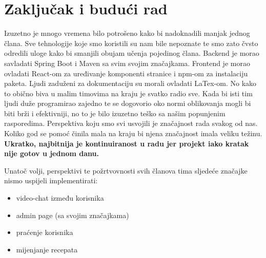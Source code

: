 \chapter{Zaključak i budući rad}
		
		
		\noindent Izuzetno je mnogo vremena bilo potrošeno kako bi nadoknadili manjak jednog člana. Sve tehnologije koje smo koristili su nam bile nepoznate te smo zato čvsto odredili uloge kako bi smanjili obujam učenja pojedinog člana.
		 \noindent Backend je morao savladati Spring Boot i Maven sa svim svojim značajkama. Frontend je morao ovladati React-om za uređivanje komponenti stranice i npm-om za instalaciju paketa. Ljudi zaduženi za dokumentaciju su morali ovladati LaTex-om.
		 \noindent No kako to obično biva u malim timovima na kraju je svatko radio sve. Kada bi isti tim ljudi duže programirao zajedno te se dogovorio oko normi oblikovanja mogli bi biti brži i efektivniji, no to je bilo izuzetno teško sa našim popunjenim rasporedima.
		 \noindent Perspektiva koju smo svi usvojili je značajnost rada svakog od nas. Koliko god se pomoć činila mala na kraju bi njena značajnost imala veliku težinu.
		 \noindent \textbf{Ukratko, najbitnija je kontinuiranost u radu jer projekt iako kratak nije gotov u jednom danu.}
		 
		 \noindent Unatoč volji, perspektivi te požrtvovnosti svih članova tima sljedeće značajke nismo uspijeli implementirati:
		\begin{itemize}
			\item video-chat između korisnika
			\item admin page (sa svojim značajkama)
			\item praćenje korisnika
			\item mijenjanje recepata
		\end{itemize}
		
		\eject 